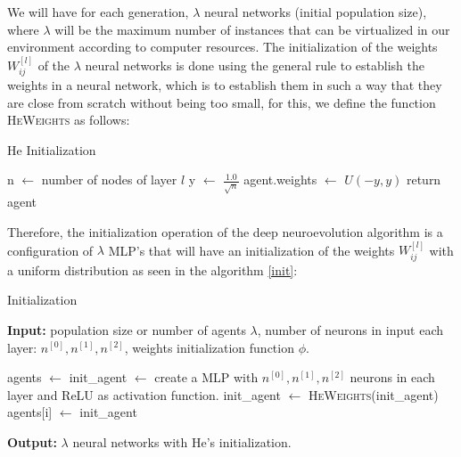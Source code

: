 \documentclass{iosart2c}
\begin{document}
We will have for each generation, $\lambda$ neural networks (initial population size), where $\lambda$ will be the maximum number of instances that can be virtualized in our environment according to computer resources. The initialization of the weights $W_{ij}^{[l]}$ of the $\lambda$ neural networks is done using the general rule to establish the weights in a neural network, which is to establish them in such a way that they are close from scratch without being too small, for this, we define the function \textsc{HeWeights} as follows: \\


\begin{algorithm}[h!]
\caption{He Initialization}\label{Hefunction}
\begin{algorithmic}[1]
\State n $\gets$ number of nodes of layer $l$  
\State y $\gets$ $\frac{1.0}{\sqrt{n}}$
\State agent.weights $\gets$ $U(-y,y)$ 
\State return agent 
\EndFunction
\end{algorithmic}
\end{algorithm}

Therefore, the initialization operation of the deep neuroevolution algorithm is a configuration of $\lambda$ MLP's that will have an initialization of the weights $W_{ij}^{[l]}$ with a uniform distribution as seen in the algorithm \ref{init}:


\begin{algorithm}[h!]
\caption{Initialization}\label{init}
\hspace*{\algorithmicindent} \textbf{Input:} population size or number of agents $\lambda$, number of neurons in input each layer: $n^{[0]}, n^{[1]}, n^{[2]}$, weights initialization function $\phi$.
\begin{algorithmic}[1]
\State agents $\gets$ 
\State init\_agent $\gets$ create a MLP with $n^{[0]}, n^{[1]}, n^{[2]}$ neurons in each layer and ReLU as activation function.
\State init\_agent $\gets$ \textsc{HeWeights}(init\_agent) 
\State agents[i] $\gets$ init\_agent 
\EndFor
\end{algorithmic}
\hspace*{\algorithmicindent} \textbf{Output:} $\lambda$ neural networks with He's initialization.
\end{algorithm}
\end{document}
